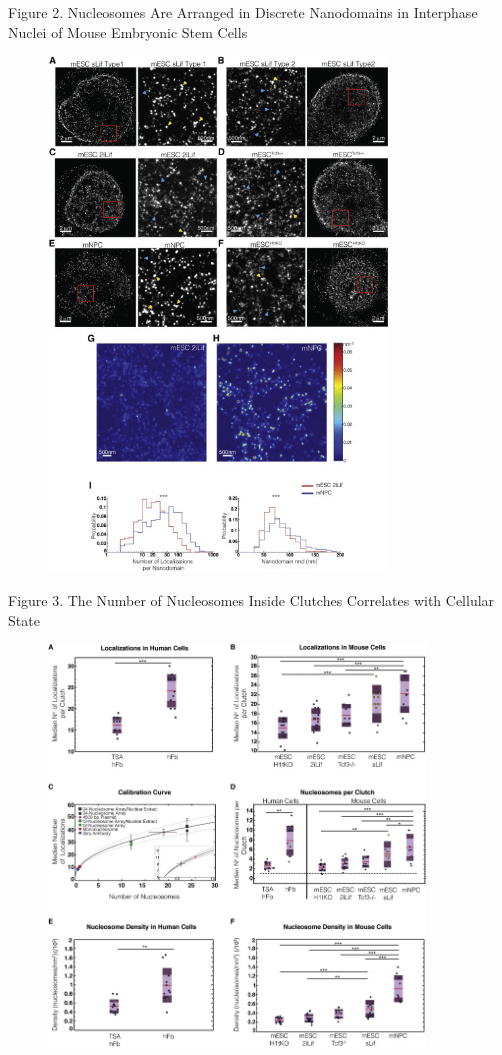 \documentclass{beamer}			%
\begin{document}
\begin{frame}{Figure 2. Nucleosomes Are Arranged in Discrete Nanodomains in Interphase Nuclei of Mouse Embryonic Stem Cells}
\begin{figure}
\includegraphics[width=9cm]{Figure-2.jpg}
\end{figure}
\end{frame}

\begin{frame}{Figure 3. The Number of Nucleosomes Inside Clutches Correlates with Cellular State}
\begin{figure}
\includegraphics[width=10cm]{Figure-3.jpg}
\end{figure}
\end{frame}
\end{document}
